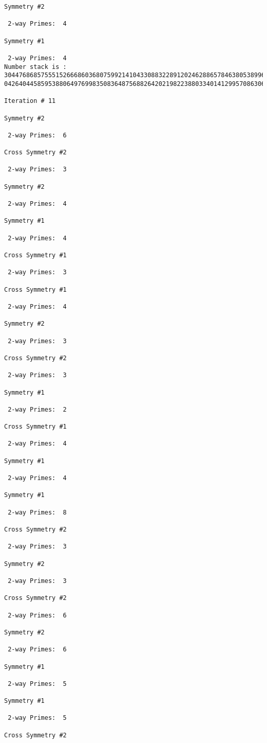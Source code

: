 \begin{verbatim}
Symmetry #2

 2-way Primes: 	4

Symmetry #1

 2-way Primes: 	4
Number stack is :
30447686857555152666860368075992141043308832289120246288657846380538996794608835958544046240163340857
04264044585953880649769983508364875688264202198223880334014129957086306866625155575868674403758043361

Iteration #	11

Symmetry #2

 2-way Primes: 	6

Cross Symmetry #2

 2-way Primes: 	3

Symmetry #2

 2-way Primes: 	4

Symmetry #1

 2-way Primes: 	4

Cross Symmetry #1

 2-way Primes: 	3

Cross Symmetry #1

 2-way Primes: 	4

Symmetry #2

 2-way Primes: 	3

Cross Symmetry #2

 2-way Primes: 	3

Symmetry #1

 2-way Primes: 	2

Cross Symmetry #1

 2-way Primes: 	4

Symmetry #1

 2-way Primes: 	4

Symmetry #1

 2-way Primes: 	8

Cross Symmetry #2

 2-way Primes: 	3

Symmetry #2

 2-way Primes: 	3

Cross Symmetry #2

 2-way Primes: 	6

Symmetry #2

 2-way Primes: 	6

Symmetry #1

 2-way Primes: 	5

Symmetry #1

 2-way Primes: 	5

Cross Symmetry #2


\end{verbatim}
